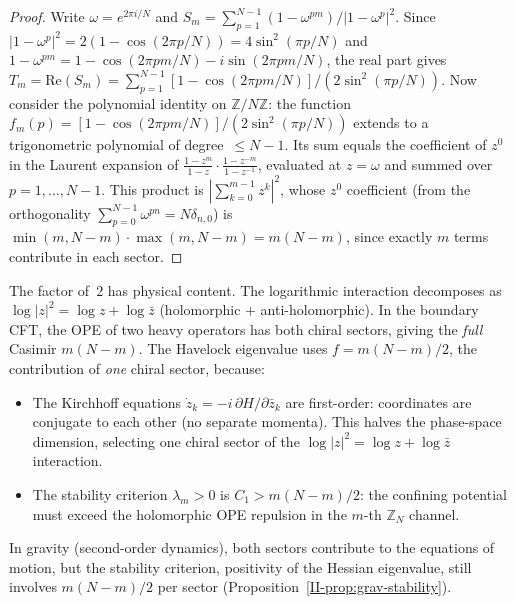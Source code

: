 \begin{proof}
Write $\omega = e^{2\pi i/N}$ and
$S_m = \sum_{p=1}^{N-1}(1 - \omega^{pm})/|1 - \omega^p|^2$.
Since $|1 - \omega^p|^2 = 2(1 - \cos(2\pi p/N))
= 4\sin^2(\pi p/N)$ and
$1 - \omega^{pm} = 1 - \cos(2\pi pm/N) - i\sin(2\pi pm/N)$,
the real part gives
$T_m = \mathrm{Re}(S_m)
= \sum_{p=1}^{N-1}[1 - \cos(2\pi pm/N)]/(2\sin^2(\pi p/N))$.
Now consider the polynomial identity on
$\mathbb{Z}/N\mathbb{Z}$: the function
$f_m(p) = [1 - \cos(2\pi pm/N)]/(2\sin^2(\pi p/N))$
extends to a trigonometric polynomial of degree~$\le N{-}1$.
Its sum equals the coefficient of $z^0$ in the Laurent
expansion of $\frac{1 - z^m}{1 - z}\cdot\frac{1 - z^{-m}}{1 - z^{-1}}$,
evaluated at $z = \omega$ and summed over $p = 1,\ldots,N{-}1$.
This product is $|\sum_{k=0}^{m-1}z^k|^2$, whose
$z^0$ coefficient (from the orthogonality
$\sum_{p=0}^{N-1}\omega^{pn} = N\delta_{n,0}$) is
$\min(m, N{-}m) \cdot \max(m, N{-}m) = m(N{-}m)$,
since exactly $m$ terms contribute in each sector.
\end{proof}

The factor of~$2$ has physical content.
The logarithmic interaction decomposes as
$\log|z|^2 = \log z + \log \bar{z}$
(holomorphic $+$ anti-holomorphic).
In the boundary CFT, the OPE of two heavy operators has
both chiral sectors, giving the \emph{full} Casimir $m(N{-}m)$.
The Havelock eigenvalue uses $f = m(N{-}m)/2$, the
contribution of \emph{one} chiral sector, because:
\begin{itemize}
  \item The Kirchhoff equations $\dot{z}_k = -i\,\partial H/\partial\bar{z}_k$
    are first-order: coordinates are conjugate to each other
    (no separate momenta).
    This halves the phase-space dimension, selecting one chiral
    sector of the $\log|z|^2 = \log z + \log\bar{z}$ interaction.
  \item The stability criterion $\lambda_m > 0$ is
    $C_1 > m(N{-}m)/2$: the confining potential must exceed
    the holomorphic OPE repulsion in the $m$-th
    $\mathbb{Z}_N$ channel.
\end{itemize}

In gravity (second-order dynamics), both sectors contribute
to the equations of motion, but the stability criterion, positivity of the Hessian eigenvalue, still involves
$m(N{-}m)/2$ per sector
(Proposition~\ref{II-prop:grav-stability}).

